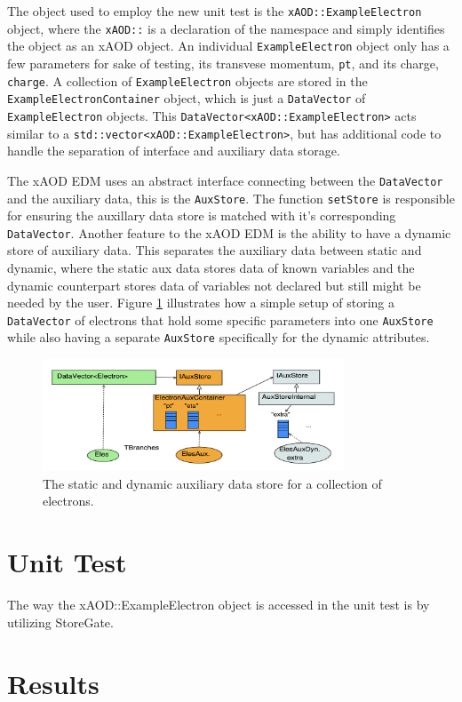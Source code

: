 The object used to employ the new unit test is the \verb|xAOD::ExampleElectron| object, where the \verb|xAOD::| is a declaration of the namespace and simply identifies the object as an xAOD object.
An individual \verb|ExampleElectron| object only has a few parameters for sake of testing, its transvese momentum, \verb|pt|, and its charge, \verb|charge|.
A collection of \verb|ExampleElectron| objects are stored in the \verb|ExampleElectronContainer| object, which is just a \verb|DataVector| of \verb|ExampleElectron| objects.\cite{Buckley_2015}
This \verb|DataVector<xAOD::ExampleElectron>| acts similar to a \verb|std::vector<xAOD::ExampleElectron>|, but has additional code to handle the separation of interface and auxiliary data storage. 


The xAOD EDM uses an abstract interface connecting between the \verb|DataVector| and the auxiliary data, this is the \verb|AuxStore|. 
The function \verb|setStore| is responsible for ensuring the auxillary data store is matched with it's corresponding \verb|DataVector|.
Another feature to the xAOD EDM is the ability to have a dynamic store of auxiliary data.
This separates the auxiliary data between static and dynamic, where the static aux data stores data of known variables and the dynamic counterpart stores data of variables not declared but still might be needed by the user. 
Figure \ref{fig:Mod_utests_aux_store} illustrates how a simple setup of storing a \verb|DataVector| of electrons that hold some specific parameters into one \verb|AuxStore| while also having a separate \verb|AuxStore| specifically for the dynamic attributes. 

\begin{figure}[h]
    \centering
    \includegraphics[width=0.8\textwidth]{content/img/auxstore.png}
    \caption{The static and dynamic auxiliary data store for a collection of electrons.}
    \label{fig:Mod_utests_aux_store}
\end{figure}


\section{Unit Test}

The way the xAOD::ExampleElectron object is accessed in the unit test is by utilizing StoreGate. 

\section{Results}
